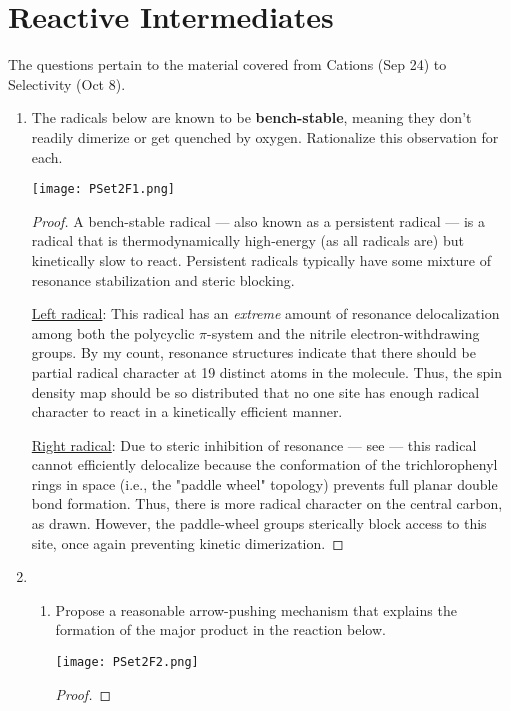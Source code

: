 \documentclass[../psets.tex]{subfiles}
\begin{document}
\section{Reactive Intermediates}
The questions pertain to the material covered from Cations (Sep 24) to Selectivity (Oct 8).
\begin{enumerate}
    \item The radicals below are known to be \textbf{bench-stable}, meaning they don't readily dimerize or get quenched by oxygen. Rationalize this observation for each.
    \begin{center}
        \texttt{[image: PSet2F1.png]}
    \end{center}
    \begin{proof}
        A bench-stable radical --- also known as a persistent radical --- is a radical that is thermodynamically high-energy (as all radicals are) but kinetically slow to react. Persistent radicals typically have some mixture of resonance stabilization and steric blocking.\par
        \underline{Left radical}: This radical has an \emph{extreme} amount of resonance delocalization among both the polycyclic $\pi$-system and the nitrile electron-withdrawing groups. By my count, resonance structures indicate that there should be partial radical character at 19 distinct atoms in the molecule. Thus, the spin density map should be so distributed that no one site has enough radical character to react in a kinetically efficient manner.\par
        \underline{Right radical}: Due to steric inhibition of resonance --- see \textcite[282]{bib:Anslyn} --- this radical cannot efficiently delocalize because the conformation of the trichlorophenyl rings in space (i.e., the "paddle wheel" topology) prevents full planar double bond formation. Thus, there is more radical character on the central carbon, as drawn. However, the paddle-wheel groups sterically block access to this site, once again preventing kinetic dimerization.
    \end{proof}
    \pagebreak
    \item 
    \begin{enumerate}
        \item Propose a reasonable arrow-pushing mechanism that explains the formation of the major product in the reaction below.
        \begin{center}
            \texttt{[image: PSet2F2.png]}
        \end{center}
        \begin{proof}


\end{proof}
\end{enumerate}
\end{enumerate}
\end{document}
